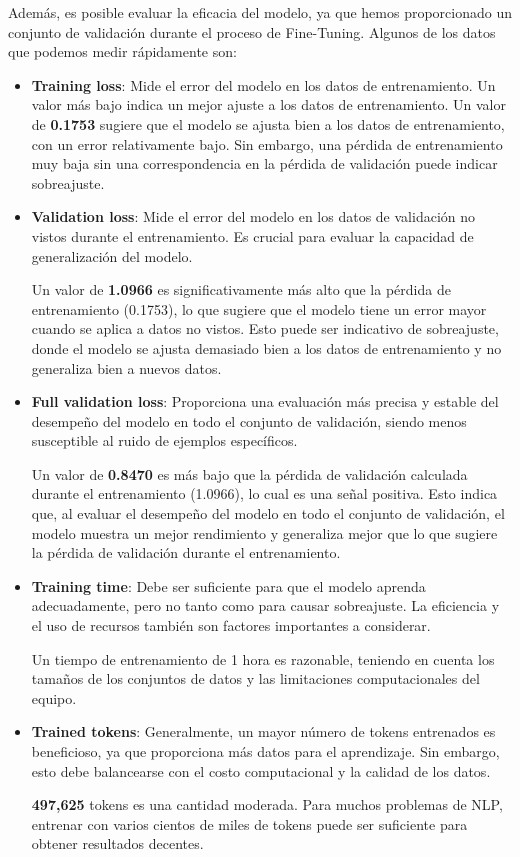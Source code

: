 Además, es posible evaluar la eficacia del modelo, ya que hemos proporcionado un conjunto de validación durante el proceso de Fine-Tuning. Algunos de los datos que podemos medir rápidamente son: 

\begin{itemize}
\item \textbf{Training loss}: Mide el error del modelo en los datos de entrenamiento. Un valor más bajo indica un mejor ajuste a los datos de entrenamiento.
Un valor de \textbf{0.1753} sugiere que el modelo se ajusta bien a los datos de entrenamiento, con un error relativamente bajo. Sin embargo, una pérdida de entrenamiento muy baja sin una correspondencia en la pérdida de validación puede indicar sobreajuste.

\item \textbf{Validation loss}: Mide el error del modelo en los datos de validación no vistos durante el entrenamiento. Es crucial para evaluar la capacidad de generalización del modelo.

Un valor de \textbf{1.0966} es significativamente más alto que la pérdida de entrenamiento (0.1753), lo que sugiere que el modelo tiene un error mayor cuando se aplica a datos no vistos. Esto puede ser indicativo de sobreajuste, donde el modelo se ajusta demasiado bien a los datos de entrenamiento y no generaliza bien a nuevos datos.

\item \textbf{Full validation loss}: Proporciona una evaluación más precisa y estable del desempeño del modelo en todo el conjunto de validación, siendo menos susceptible al ruido de ejemplos específicos.

Un valor de \textbf{0.8470} es más bajo que la pérdida de validación calculada durante el entrenamiento (1.0966), lo cual es una señal positiva. Esto indica que, al evaluar el desempeño del modelo en todo el conjunto de validación, el modelo muestra un mejor rendimiento y generaliza mejor que lo que sugiere la pérdida de validación durante el entrenamiento.

\item \textbf{Training time}: Debe ser suficiente para que el modelo aprenda adecuadamente, pero no tanto como para causar sobreajuste. La eficiencia y el uso de recursos también son factores importantes a considerar.

Un tiempo de entrenamiento de 1 hora es razonable, teniendo en cuenta los tamaños de los conjuntos de datos y las limitaciones computacionales del equipo.

\item \textbf{Trained tokens}: Generalmente, un mayor número de \gls{token}s entrenados es beneficioso, ya que proporciona más datos para el aprendizaje. Sin embargo, esto debe balancearse con el costo computacional y la calidad de los datos.

\textbf{497,625} \gls{token}s es una cantidad moderada. Para muchos problemas de \acrshort{NLP}, entrenar con varios cientos de miles de tokens puede ser suficiente para obtener resultados decentes.

\end{itemize}


